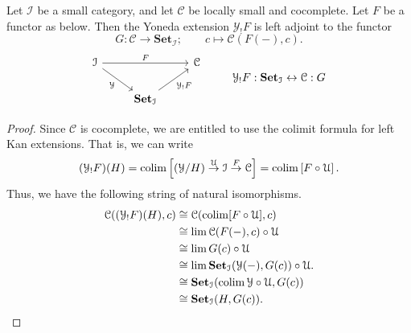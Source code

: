 \documentclass[main.tex]{subfiles}
\begin{document}
\begin{lemma}
  \label{lemma:right_adjoint_to_yoneda_extension}
  Let $\mathcal{I}$ be a small category, and let $\mathcal{C}$ be locally small and cocomplete. Let $F$ be a functor as below. Then the Yoneda extension $\mathcal{Y}_{!}F$ is left adjoint to the functor
  \begin{equation*}
    G\colon \mathcal{C} \to \mathbf{Set}_{\mathcal{I}};\qquad c \mapsto \mathcal{C}(F(-), c).
  \end{equation*}
  \begin{equation*}
    \begin{tikzcd}
      \mathcal{I}
      \arrow[rr, "F"]
      \arrow[dr, swap, "\mathcal{Y}"]
      && \mathcal{C}
      \\
      & {\mathbf{Set}_{\mathcal{I}}}
      \arrow[ur, swap, "\mathcal{Y}_{!}F"]
    \end{tikzcd}
    \qquad
    \begin{tikzcd}
      \mathcal{Y}_{!}F : \mathbf{Set}_{\mathcal{I}} \leftrightarrow \mathcal{C} : G
    \end{tikzcd}
  \end{equation*}
\end{lemma}
\begin{proof}
  Since $\mathcal{C}$ is cocomplete, we are entitled to use the colimit formula for left Kan extensions. That is, we can write
  \begin{equation*}
    (\mathcal{Y}_{!}F)(H) = \operatorname*{colim} \left[ (\mathcal{Y} / H) \overset{\mathcal{U}}{\to} \mathcal{I} \overset{F}{\to} \mathcal{C} \right] = \operatorname*{colim} \left[ F \circ \mathcal{U} \right].
  \end{equation*}
  Thus, we have the following string of natural isomorphisms.
  \begin{align*}
    \mathcal{C}((\mathcal{Y}_{!}F)(H), c) &\cong \mathcal{C}(\operatorname*{colim} [F \circ \mathcal{U}], c) \\
    &\cong \lim\mathcal{C}(F(-), c) \circ \mathcal{U} \\
    &\cong \lim G(c) \circ \mathcal{U} \\
    &\cong \lim\mathbf{Set}_{\mathcal{I}}(\mathcal{Y}(-), G(c)) \circ \mathcal{U}. \\
    &\cong\mathbf{Set}_{\mathcal{I}}(\operatorname*{colim}\mathcal{Y} \circ \mathcal{U}, G(c)) \\
    &\cong\mathbf{Set}_{\mathcal{I}}(H, G(c)).
  \end{align*}
\end{proof}
\end{document}
